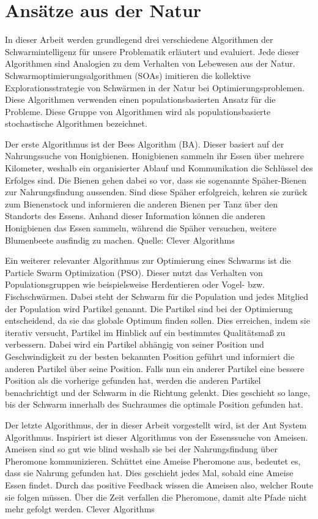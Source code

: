 \section{Ansätze aus der Natur}
In dieser Arbeit werden grundlegend drei verschiedene Algorithmen der Schwarmintelligenz für unsere Problematik  erläutert und evaluiert. Jede dieser Algorithmen sind Analogien zu dem Verhalten von Lebewesen aus der Natur. Schwarmoptimierungsalgorithmen (SOAs) imitieren die kollektive Explorationsstrategie von Schwärmen in der Natur bei Optimierungsproblemen. Diese Algorithmen verwenden einen populationsbasierten Ansatz für die Probleme. Diese Gruppe von Algorithmen wird als populationsbasierte stochastische Algorithmen bezeichnet.

Der erste Algorithmus ist der Bees Algorithm (BA). Dieser basiert auf der Nahrungssuche von Honigbienen. Honigbienen sammeln ihr Essen über mehrere Kilometer, weshalb ein organisierter Ablauf und Kommunikation die Schlüssel des Erfolges sind. Die Bienen gehen dabei so vor, dass sie sogenannte Späher-Bienen zur Nahrungsfindung aussenden. Sind diese Späher erfolgreich, kehren sie zurück zum Bienenstock und informieren die anderen Bienen per Tanz über den Standorts des Essens. Anhand dieser Information können die anderen Honigbienen das Essen sammeln, während die Späher versuchen, weitere Blumenbeete ausfindig zu machen. Quelle: Clever Algorithms

Ein weiterer relevanter Algorithmus zur Optimierung eines Schwarms ist die Particle Swarm Optimization (PSO). Dieser nutzt das Verhalten von Populationsgruppen wie beispielsweise Herdentieren oder  Vogel- bzw. Fischschwärmen. Dabei steht der Schwarm für die Population und jedes Mitglied der Population wird Partikel genannt. Die Partikel sind bei der Optimierung entscheidend, da sie das globale Optimum finden sollen. Dies erreichen, indem sie iterativ versucht, Partikel im Hinblick auf ein bestimmtes Qualitätsmaß zu verbessern. Dabei wird ein Partikel abhängig von seiner Position und Geschwindigkeit zu der besten bekannten Position geführt und informiert die anderen Partikel über seine Position. Falls nun ein anderer Partikel eine bessere Position als die vorherige gefunden hat, werden die anderen Partikel benachrichtigt und der Schwarm in die Richtung gelenkt. Dies geschieht so lange, bis der Schwarm innerhalb des Suchraumes die optimale Position gefunden hat. 

Der letzte Algorithmus, der in dieser Arbeit vorgestellt wird, ist der Ant System Algorithmus. Inspiriert ist dieser Algorithmus von der Essenssuche von Ameisen. Ameisen sind so gut wie blind weshalb sie bei der Nahrungsfindung über Pheromone kommunizieren. Schüttet eine Ameise Pheromone aus, bedeutet es, dass sie Nahrung gefunden hat. Dies geschieht jedes Mal, sobald eine Ameise Essen findet. Durch das positive Feedback wissen die Ameisen also, welcher Route sie folgen müssen. Über die Zeit verfallen die Pheromone, damit alte Pfade nicht mehr gefolgt werden. 
Clever Algorithms

